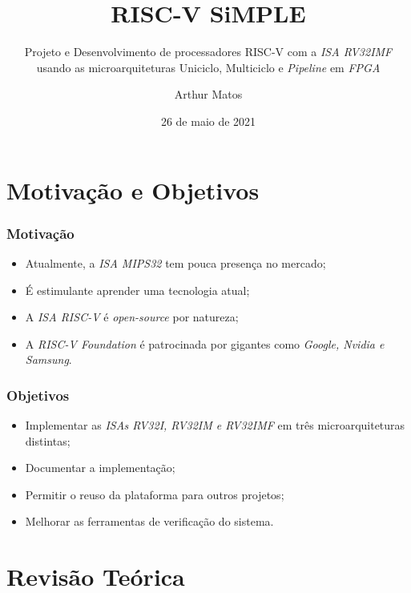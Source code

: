\documentclass[aspectratio=169]{beamer}
\title{RISC-V SiMPLE}
\subtitle{Projeto e Desenvolvimento de processadores RISC-V com a \textit{ISA RV32IMF} usando as microarquiteturas Uniciclo, Multiciclo e \textit{Pipeline} em \textit{FPGA}}
\author{Arthur Matos}
\institute{Universidade de Brasília - UnB --- Faculdade de Tecnologia - FT}
\date{26 de maio de 2021}
\begin{document}
\begin{frame}
\titlepage
\end{frame}


\section{Motivação e Objetivos}
    \begin{frame}
        \frametitle{Motivação}
        \vfill
        \begin{itemize}
            \item Atualmente, a \textit{ISA MIPS32} tem pouca presença no mercado;
            \item É estimulante aprender uma tecnologia atual;
            \item A \textit{ISA RISC-V} é \textit{open-source} por natureza;
            \item A \textit{RISC-V Foundation} é patrocinada por gigantes como \textit{Google, Nvidia e Samsung}.
        \end{itemize}
        \vfill
    \end{frame}

    \begin{frame}
        \frametitle{Objetivos}
        \vfill
        \begin{itemize}
            \item Implementar as \textit{ISAs RV32I, RV32IM e RV32IMF} em três microarquiteturas distintas;
            \item Documentar a implementação;
            \item Permitir o reuso da plataforma para outros projetos;
            \item Melhorar as ferramentas de verificação do sistema.
        \end{itemize}
        \vfill
    \end{frame}

\section{Revisão Teórica}
\end{document}
